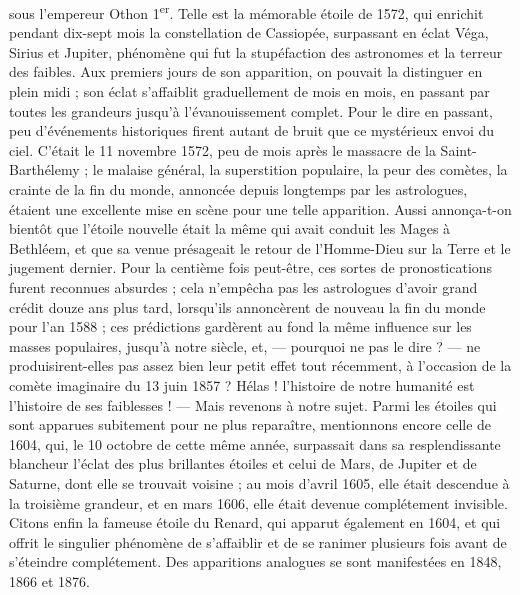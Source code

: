 \documentclass[a4paper, 11pt, oneside, landscape]{article}
\begin{document}
sous l'empereur Othon 1\textsuperscript{er}. Telle est la mémorable étoile de 1572, qui enrichit pendant dix-sept mois la constellation de Cassiopée, surpassant en éclat Véga, Sirius et Jupiter, phénomène qui fut la stupéfaction des astronomes et la terreur des faibles. Aux premiers jours de son apparition, on pouvait la distinguer en plein midi ; son éclat s'affaiblit graduellement de mois en mois, en passant par toutes les grandeurs jusqu'à l'évanouissement complet. Pour le dire en passant, peu d'événements historiques firent autant de bruit que ce mystérieux envoi du ciel. C'était le 11 novembre 1572, peu de mois après le massacre de la Saint-Barthélemy ; le malaise général, la superstition populaire, la peur des comètes, la crainte de la fin du monde, annoncée depuis longtemps par les astrologues, étaient une excellente mise en scène pour une telle apparition. Aussi annonça-t-on bientôt que l'étoile nouvelle était la même qui avait conduit les Mages à Bethléem, et que sa venue présageait le retour de l'Homme-Dieu sur la Terre et le jugement dernier. Pour la centième fois peut-être, ces sortes de pronostications furent reconnues absurdes ; cela n'empêcha pas les astrologues d'avoir grand crédit douze ans plus tard, lorsqu'ils annoncèrent de nouveau la fin du monde pour l'an 1588 ; ces prédictions gardèrent au fond la même influence sur les masses populaires, jusqu'à notre siècle, et, --- pourquoi ne pas le dire ? --- ne produisirent-elles pas assez bien leur petit effet tout récemment, à l'occasion de la comète imaginaire du 13 juin 1857 ? Hélas ! l'histoire de notre humanité est l'histoire de ses faiblesses ! --- Mais revenons à notre sujet. Parmi les étoiles qui sont apparues subitement pour ne plus reparaître, mentionnons encore celle de 1604, qui, le 10 octobre de cette même année, surpassait dans sa resplendissante blancheur l'éclat des plus brillantes étoiles et celui de Mars, de Jupiter et de Saturne, dont elle se trouvait voisine ; au mois d'avril 1605, elle était descendue à la troisième grandeur, et en mars 1606, elle était devenue complétement invisible. Citons enfin la fameuse étoile du Renard, qui apparut également en 1604, et qui offrit le singulier phénomène de s'affaiblir et de se ranimer plusieurs fois avant de s'éteindre complétement. Des apparitions analogues se sont manifestées en 1848, 1866 et 1876.
\end{document}

